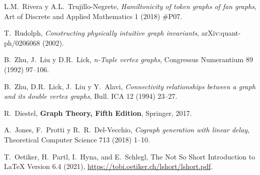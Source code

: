 \begin{thebibliography}{99}
  L.M.~Rivera y A.L.~Trujillo-Negrete,
  \textit{Hamiltonicity of token graphs of fan graphs},
  Art of Discrete and Applied Mathematics 1 (2018) \#P07. 

T.~Rudolph,
 \textit{Constructing physically intuitive graph invariants},
 arXiv:quant-ph/0206068 (2002).

  B.~Zhu, J.~Liu y D.R.~Lick,
 \textit{n-Tuple vertex graphs},
 Congressus Numerantium 89 (1992) 97--106.

  B.~Zhu, D.R.~Lick, J.~Liu y Y.~Alavi,
 \textit{Connectivity relationships between a graph and
 its double vertex graphs},
 Bull. ICA 12 (1994) 23--27.


  R.~Diestel,
  \textbf{Graph Theory, Fifth Edition},
  Springer, 2017.

  A.~Jones, F.~Protti y R.~R.~Del-Vecchio,
  \textit{Cograph generation with linear delay},
  Theoretical Computer Science 713 (2018) 1--10.

  T.~Oetiker, H.~Partl, I.~Hyna, and E.~Schlegl,
  The Not So Short Introduction to \LaTeX{} Version 6.4 (2021),
  \href{https://tobi.oetiker.ch/lshort/lshort.pdf}{%
  https://tobi.oetiker.ch/lshort/lshort.pdf}.

\end{thebibliography}
